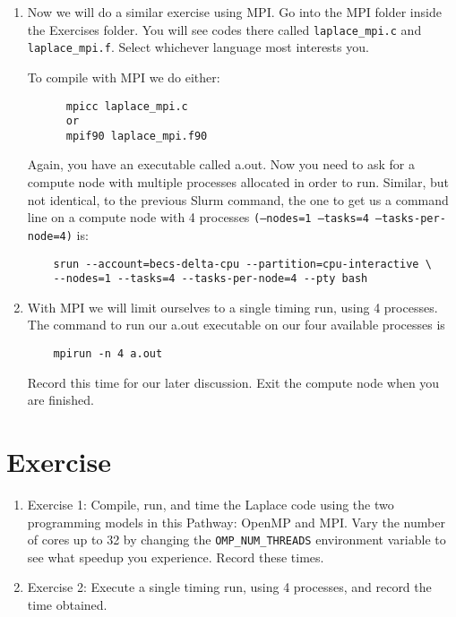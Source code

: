 \documentclass[11pt]{article}
\begin{document}
\begin{enumerate}
  \item{Now we will do a similar exercise using MPI. Go into the MPI folder inside the Exercises folder. You will see codes there called \texttt{laplace\_mpi.c} and \texttt{laplace\_mpi.f}. Select whichever language most interests you.
  
  To compile with MPI we do either:
    \begin{verbatim}
      mpicc laplace_mpi.c
      or
      mpif90 laplace_mpi.f90
    \end{verbatim}
  
  Again, you have an executable called a.out. Now you need to ask for a compute node with multiple processes allocated in order to run. Similar, but not identical, to the previous Slurm command, the one to get us a command line on a compute node with 4 processes \texttt{(--nodes=1 --tasks=4 --tasks-per-node=4)} is:
  \begin{verbatim}
    srun --account=becs-delta-cpu --partition=cpu-interactive \
    --nodes=1 --tasks=4 --tasks-per-node=4 --pty bash
  \end{verbatim}
  }
  \item{With MPI we will limit ourselves to a single timing run, using 4 processes. The command to
  run our a.out executable on our four available processes is
  \begin{verbatim}
    mpirun -n 4 a.out
  \end{verbatim}
  Record this time for our later discussion.
  Exit the compute node when you are finished.}
\end{enumerate}

\section {Exercise}

\begin{enumerate}
  \item{Exercise 1: Compile, run, and time the Laplace code using the two programming models in this Pathway: OpenMP and MPI.}
    Vary the number of cores up to 32 by changing the \texttt{OMP\_NUM\_THREADS} environment variable to see what speedup you experience. Record these times.


  \item{Exercise 2: Execute a single timing run, using 4 processes, and record the time obtained.}

\end{enumerate}
\end{document}
